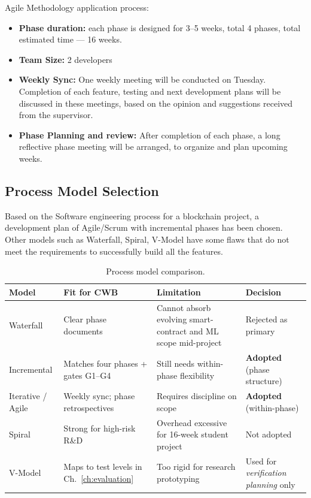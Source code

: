 Agile Methodology application process:
\begin{itemize}[noitemsep]
\item \textbf{Phase duration:} each phase is designed for 3--5 weeks, total 4 phases, total estimated time --- 16 weeks.
\item \textbf{Team Size:} 2 developers
\item \textbf{Weekly Sync:} One weekly meeting will be conducted on Tuesday. Completion of each feature, testing and next development plans will be discussed in these meetings, based on the opinion and suggestions received from the supervisor.
\item \textbf{Phase Planning and review:} After completion of each phase, a long reflective phase meeting will be arranged, to organize and plan upcoming weeks.
\end{itemize}

\subsection{Process Model Selection}
\label{sec:process-model-selection}
\label{sec:mvc-pattern}

Based on the Software engineering process for a blockchain project, a development plan of Agile/Scrum with incremental phases has been chosen. Other models such as Waterfall, Spiral, V-Model have some flaws that do not meet the requirements to successfully build all the features.

\begin{table}[H]
\centering
\caption[Process model comparison]{Process model comparison.}
\label{tab:process-model-comparison}
\small
\begin{tabular}{@{}p{2.4cm}p{3.2cm}p{3.2cm}p{5.4cm}@{}}
\toprule
\tableheadcolor
\textbf{Model} & \textbf{Fit for CWB} & \textbf{Limitation} & \textbf{Decision} \\
\midrule
Waterfall & Clear phase documents & Cannot absorb evolving smart-contract and ML scope mid-project & Rejected as primary \\
Incremental & Matches four phases + gates G1--G4 & Still needs within-phase flexibility & \textbf{Adopted} (phase structure) \\
Iterative / Agile & Weekly sync; phase retrospectives & Requires discipline on scope & \textbf{Adopted} (within-phase) \\
Spiral & Strong for high-risk R\&D & Overhead excessive for 16-week student project & Not adopted \\
V-Model & Maps to test levels in Ch.~\ref{ch:evaluation} & Too rigid for research prototyping & Used for \textit{verification planning} only \\
\bottomrule
\end{tabular}
\end{table}

